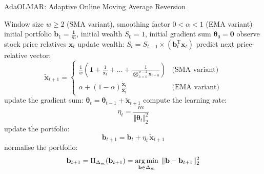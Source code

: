 \begin{algorithm}
  \caption{AdaOLMAR: Adaptive Online Moving Average Reversion}
\label{alg:adaolmar}
  \begin{algorithmic}[1]
     Window size $w \geq 2$ (SMA variant), smoothing factor $0 < \alpha < 1$ (EMA variant)
     initial portfolio $\mathbf{b}_1 = \frac{\mathbf{1}}{m}$, initial wealth $S_0 = 1$, initial gradient sum $\boldsymbol{\theta}_0 = \mathbf{0}$
      \STATE observe stock price relatives $\mathbf{x}_t$
      \STATE update wealth:
        $
          S_t = S_{t-1} \times (\mathbf{b}_t^\text{T}\mathbf{x}_t)
        $
      	\STATE predict next price-relative vector:
	\begin{equation*}
		\widetilde{\mathbf{x}}_{t+1} =
		\begin{cases}
			\frac{1}{w}\left(\mathbf{1} + \frac{1}{\mathbf{x}_t} + \ldots + \frac{1}{\bigotimes_{h=0}^{w-2}\mathbf{x}_{t-h}}\right) & \text{(SMA variant)} \\
			\alpha + (1-\alpha)\frac{\widetilde{\mathbf{x}}_{t}}{\mathbf{x}_t} & \text{(EMA variant)}
		\end{cases}
	\end{equation*}
        \STATE update the gradient sum: $\boldsymbol{\theta}_t = \boldsymbol{\theta}_{t-1} + \widetilde{\mathbf{x}}_{t+1}$
        \STATE compute the learning rate:
        \begin{equation*}
        	\eta_t = \frac{m}{\Vert\boldsymbol{\theta}_{t}\Vert^2_2}
        \end{equation*}
        \STATE update the portfolio:
	\begin{equation*}
		\mathbf{b}_{t+1} = 	\mathbf{b}_{t} + \eta_t \, \widetilde{\mathbf{x}}_{t+1}
	\end{equation*}
		\STATE normalise the portfolio:
		\begin{equation*}
			\mathbf{b}_{t+1} = \Pi_{\Delta_m}(\mathbf{b}_{t+1})
			= \operatorname*{arg\,min}_{\mathbf{b}\in\Delta_m} \; \Vert\mathbf{b} - \mathbf{b}_{t+1}\Vert_2^2
		\end{equation*}
	\ENDIF
    \ENDFOR
  \end{algorithmic}
\end{algorithm}

